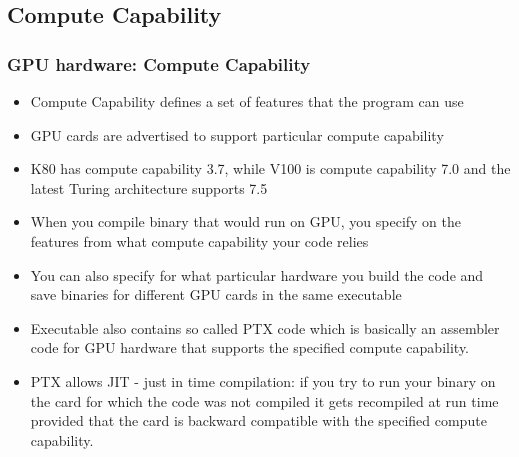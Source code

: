 \subsection{Compute Capability}
\begin{frame}[fragile]
  \frametitle{GPU hardware: Compute Capability}
\begin{itemize}
\item {\color{mycolordef}Compute Capability} defines a set of features that the program can use
\item GPU cards are advertised to support particular compute capability
\item K80 has compute capability 3.7, while V100 is compute capability 7.0 and the latest Turing architecture supports 7.5
\item When you compile binary that would run on GPU, you specify on the features from what compute capability your code relies
\item You can also specify for what particular hardware you build the code and save binaries for different GPU cards in the same executable
\item Executable also contains so called {\color{mycolordef}PTX} code which is basically an assembler code for GPU hardware that supports the specified compute capability.
\item PTX allows {\color{mycolordef}JIT - just in time compilation}: if you try to run your binary on the card for which the code was not compiled it gets 
  recompiled at run time provided that the card is backward compatible
  with the specified compute capability.
\end{itemize}
\end{frame}
